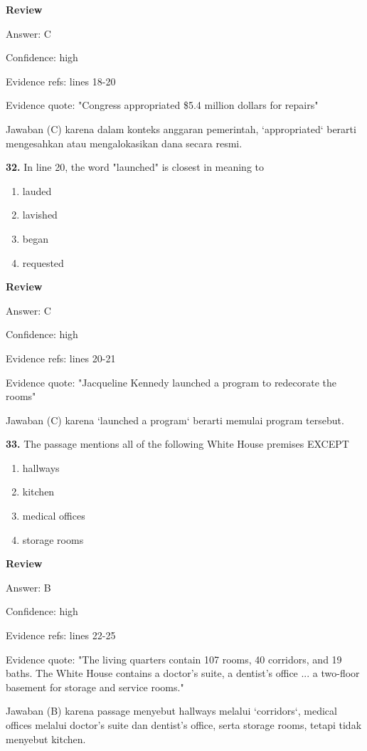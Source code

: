 \documentclass[12pt]{article}
\begin{document}
\par
\begingroup
\setlength{\parskip}{0pt}
\setlength{\parindent}{0pt}
\textbf{Review}\par
Answer: C\par
Confidence: high\par
Evidence refs: lines 18-20\par
Evidence quote: "Congress appropriated \$5.4 million dollars for repairs"\par
Jawaban (C) karena dalam konteks anggaran pemerintah, `appropriated` berarti mengesahkan atau mengalokasikan dana secara resmi.\par
\endgroup
\par
\vspace{0.25\baselineskip}
\noindent\textbf{32.} In line 20, the word "launched" is closest in meaning to
\begin{enumerate}[label=(\Alph*),leftmargin=*,itemsep=0.2em]
\item lauded
\item lavished
\item began
\item requested
\end{enumerate}
\par
\begingroup
\setlength{\parskip}{0pt}
\setlength{\parindent}{0pt}
\textbf{Review}\par
Answer: C\par
Confidence: high\par
Evidence refs: lines 20-21\par
Evidence quote: "Jacqueline Kennedy launched a program to redecorate the rooms"\par
Jawaban (C) karena `launched a program` berarti memulai program tersebut.\par
\endgroup
\par
\vspace{0.25\baselineskip}
\noindent\textbf{33.} The passage mentions all of the following White House premises EXCEPT
\begin{enumerate}[label=(\Alph*),leftmargin=*,itemsep=0.2em]
\item hallways
\item kitchen
\item medical offices
\item storage rooms
\end{enumerate}
\par
\begingroup
\setlength{\parskip}{0pt}
\setlength{\parindent}{0pt}
\textbf{Review}\par
Answer: B\par
Confidence: high\par
Evidence refs: lines 22-25\par
Evidence quote: "The living quarters contain 107 rooms, 40 corridors, and 19 baths. The White House contains a doctor's suite, a dentist's office ... a two-floor basement for storage and service rooms."\par
Jawaban (B) karena passage menyebut hallways melalui `corridors`, medical offices melalui doctor's suite dan dentist's office, serta storage rooms, tetapi tidak menyebut kitchen.\par
\endgroup
\par
\vspace{0.25\baselineskip}
\end{document}
